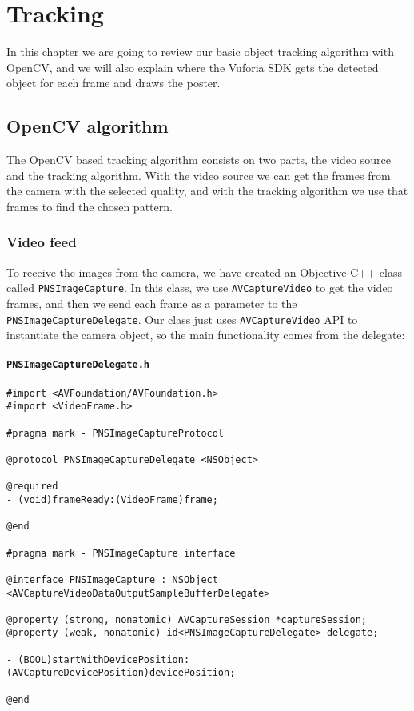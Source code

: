\chapter{Tracking}
In this chapter we are going to review our basic object tracking algorithm with
OpenCV, and we will also explain where the Vuforia SDK gets the detected object
for each frame and draws the poster.

\section{OpenCV algorithm}
The OpenCV based tracking algorithm consists on two parts, the video source and
the tracking algorithm. With the video source we can get the frames from the
camera with the selected quality, and with the tracking algorithm we use that
frames to find the chosen pattern. 

\subsection{Video feed}
To receive the images from the camera, we have created an Objective-C++ class
called \texttt{PNS\-Image\-Capture}. In this class, we use
\texttt{AV\-Capture\-Video} to get the video frames, and then we send each
frame as a parameter to the \texttt{PNS\-Image\-Capture\-Delegate}. Our class
just uses \texttt{AV\-Capture\-Video} API to instantiate the camera object, so
the main functionality comes from the delegate:

\subsubsection*{\texttt{PNSImageCaptureDelegate.h}}
\begin{verbatim}
#import <AVFoundation/AVFoundation.h>
#import <VideoFrame.h>

#pragma mark - PNSImageCaptureProtocol

@protocol PNSImageCaptureDelegate <NSObject>

@required
- (void)frameReady:(VideoFrame)frame;

@end

#pragma mark - PNSImageCapture interface

@interface PNSImageCapture : NSObject
<AVCaptureVideoDataOutputSampleBufferDelegate>

@property (strong, nonatomic) AVCaptureSession *captureSession;
@property (weak, nonatomic) id<PNSImageCaptureDelegate> delegate;

- (BOOL)startWithDevicePosition:(AVCaptureDevicePosition)devicePosition;

@end
\end{verbatim}

